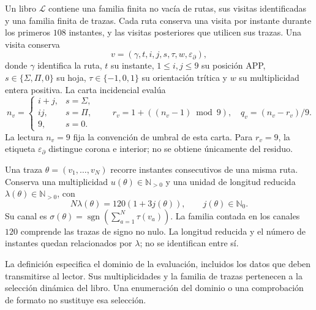 \begin{definition}
\label{vi:dep:libro-dominio}
Un libro \(\mathscr L\) contiene una familia finita no vacía de rutas,
sus visitas identificadas y una familia finita de trazas. Cada ruta
conserva una visita por instante durante los primeros \(108\) instantes,
y las visitas posteriores que utilicen sus trazas. Una visita conserva
\[
 v=(\gamma,t,i,j,s,\tau,w,\varepsilon_\partial),
\]
donde \(\gamma\) identifica la ruta, \(t\) su instante, \(1\le i,j\le9\)
su posición APP, \(s\in\{\Sigma,\Pi,0\}\) su hoja,
\(\tau\in\{-1,0,1\}\) su orientación trítica y \(w\) su multiplicidad
entera positiva. La carta incidencial evalúa
\[
 n_v=
 \begin{cases}
 i+j,&s=\Sigma,\\
 ij,&s=\Pi,\\
 9,&s=0.
 \end{cases}
 \qquad
 r_v=1+((n_v-1)\bmod9),\quad q_v=(n_v-r_v)/9.
\]
La lectura \(n_v=9\) fija la convención de umbral de esta carta.
Para \(r_v=9\), la etiqueta \(\varepsilon_\partial\) distingue
corona e interior; no se obtiene únicamente del residuo.

Una traza \(\theta=(v_1,\ldots,v_N)\) recorre instantes consecutivos de
una misma ruta. Conserva una multiplicidad \(u(\theta)\in\mathbb N_{>0}\)
y una unidad de longitud reducida
\(\lambda(\theta)\in\mathbb N_{>0}\), con
\[
 N\lambda(\theta)=120(1+3j(\theta)),\qquad j(\theta)\in\mathbb N_0.
\]
Su canal es
\(\sigma(\theta)=\operatorname{sgn}(\sum_{a=1}^N\tau(v_a))\).
La familia contada en los canales \(120\) comprende las trazas de
signo no nulo. La longitud reducida y el número de instantes quedan
relacionados por \(\lambda\); no se identifican entre sí.
\end{definition}

La definición especifica el dominio de la evaluación, incluidos los
datos que deben transmitirse al lector. Sus multiplicidades y la familia
de trazas pertenecen a la selección dinámica del libro. Una enumeración
del dominio o una comprobación de formato no sustituye esa selección.

